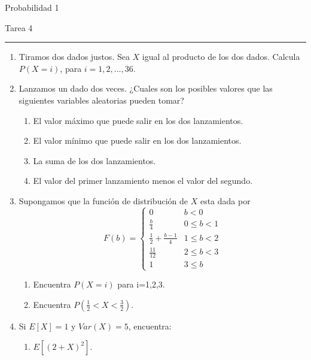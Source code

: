 \documentclass{article}
\begin{document}
\begin{center}
  \textsf{\Large Probabilidad 1}
  \par\medskip
  \textsf{\large Tarea 4}
\end{center}
\hrule
\par\bigskip

\begin{enumerate}
  \item Tiramos dos dados justos. Sea $X$ igual al producto de los dos dados. Calcula $P\left(X=i\right)$, para $i=1, 2, \ldots, 36.$
  \item Lanzamos un dado dos veces. ¿Cuales son los posibles valores que las siguientes variables aleatorias pueden tomar?
        \begin{enumerate}
          \item El valor máximo que puede salir en los dos lanzamientos.
          \item El valor mínimo que puede salir en los dos lanzamientos.
          \item La suma de los dos lanzamientos.
          \item El valor del primer lanzamiento menos el valor del segundo.
        \end{enumerate}
  \item Supongamos que la función de distribución de $X$ esta dada por
        \begin{equation*}
          F(b)=
          \begin{cases}
            0                         & b < 0      \\
            \frac{b}{4}               & 0\leq b <1 \\
            \frac{1}{2}+\frac{b-1}{4} & 1\leq b <2 \\
            \frac{11}{12}             & 2\leq b <3 \\
            1                         & 3\leq b
          \end{cases}
        \end{equation*}
        \begin{enumerate}
          \item Encuentra $P\left(X=i\right)$ para i=1,2,3.
          \item Encuentra $P\left(\frac{1}{2}<X<\frac{3}{2}\right)$.
        \end{enumerate}
  \item Si $E\left[X\right]=1$ y $Var\left(X\right)=5$, encuentra:
        \begin{enumerate}
          \item $E\left[(2+X)^2\right]$.

\end{enumerate}
\end{enumerate}
\end{document}
